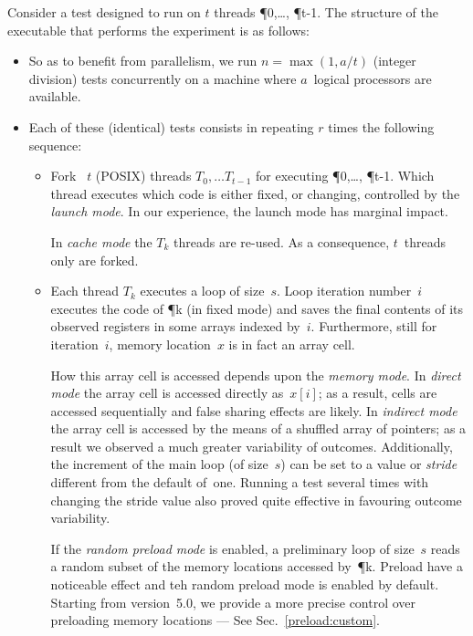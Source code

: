 Consider a test 
designed to run on $t$ threads \P{0},\ldots, \P{t-1}.
The structure of the executable  that performs
the experiment is as follows:
\begin{itemize}
\item \label{defn}\label{defa}So as to benefit from parallelism, 
we run $n = \max(1,a/t)$ (integer division)
tests concurrently on a machine where $a$~logical processors are available.
\item \label{defr}Each of these (identical)
tests consists in repeating $r$ times
the following sequence:
\begin{itemize}
\item Fork ~$t$ (POSIX) threads $T_0,\ldots T_{t-1}$
for executing \P{0},\ldots, \P{t-1}.
Which thread executes which code is either fixed, or changing,
controlled by the \emph{launch mode}.
In our experience, the launch mode has marginal impact.

In \emph{cache mode} the $T_k$ threads are re-used.
As a consequence, $t$~threads only are forked.

\item \label{defs}Each thread $T_k$ executes a loop of size~$s$.
Loop iteration number~$i$ executes the code of \P{k} (in fixed mode)
and saves
the final contents of its observed registers in some arrays indexed by~$i$.
Furthermore, still for iteration~$i$, memory location~$x$ is in fact
an array cell.

\label{defmemorymode}\label{defstride}How this array cell is accessed depends
upon the \emph{memory mode}.
In \emph{direct mode} the array cell is accessed directly as~$x[i]$;
as a result, cells are accessed sequentially and false sharing effects
are likely.
In \emph{indirect mode} the array cell is accessed by the means of a
shuffled array of pointers;
as a result we observed a much greater variability of outcomes.
Additionally, the increment of the main loop (of size~$s$)
can be set to a value or \emph{stride} different from the default of~one.
Running a test several times with changing the stride value also
proved quite effective in favouring outcome variability.



\label{defpreload}If the \emph{random preload mode} is enabled,
a preliminary loop of size~$s$ reads
a random subset of the memory locations accessed by~\P{k}.
Preload have a noticeable effect and teh random preload mode is
enabled by default.
Starting from version~5.0, we provide a more precise control
over preloading memory locations --- See Sec.~\ref{preload:custom}.



\end{itemize}
\end{itemize}
